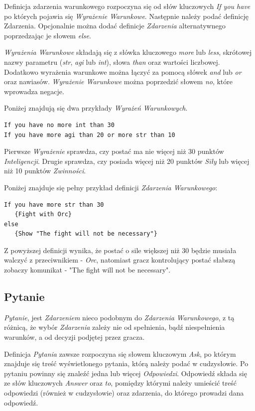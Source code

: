 \documentclass[openright]{xmgr}
\begin{document}
Definicja zdarzenia warunkowego rozpoczyna się od słów kluczowych \textit{If you have} po których pojawia się \textit{Wyrażenie Warunkowe}. Następnie należy podać definicję Zdarzenia. Opcjonalnie można dodać definicje \textit{Zdarzenia} alternatywnego poprzedzając je słowem \textit{else}.

\textit{Wyrażenia Warunkowe} składają się z słówka kluczowego \textit{more} lub \textit{less}, skrótowej nazwy parametru (\textit{str}, \textit{agi} lub \textit{int}), słowa \textit{than} oraz wartości liczbowej. Dodatkowo wyrażenia warunkowe można łączyć za pomocą słówek \textit{and} lub \textit{or} oraz nawiasów. \textit{Wyrażenie Warunkowe} można poprzedzić słowem \textit{no}, które wprowadza negacje.

Poniżej znajdują się dwa przykłady \textit{Wyrażeń Warunkowych}.
\begin{verbatim}
If you have no more int than 30
If you have more agi than 20 or more str than 10
\end{verbatim}

Pierwsze \textit{Wyrażenie} sprawdza, czy postać ma nie więcej niż 30 punktów \textit{Inteligencji}. Drugie sprawdza, czy posiada więcej niż 20 punktów \textit{Siły} lub więcej niż 10 punktów \textit{Zwinności}.

Poniżej znajduje się pełny przykład definicji \textit{Zdarzenia Warunkowego}: 
\begin{verbatim}
If you have more str than 30 
   {Fight with Orc}
else 
   {Show "The fight will not be necessary"}
\end{verbatim}

Z powyższej definicji wynika, że postać o sile większej niż 30 będzie musiała walczyć z przeciwnikiem - \textit{Orc}, natomiast gracz kontrolujący postać słabszą zobaczy komunikat - "The fight will not be necessary".

\subsection{Pytanie}
\textit{Pytanie}, jest \textit{Zdarzeniem} nieco podobnym do \textit{Zdarzenia Warunkowego}, z tą różnicą, że wybór \textit{Zdarzenia} zależy nie od spełnienia, bądź niespełnienia warunków, a od decyzji podjętej przez gracza.

Definicja \textit{Pytania} zawsze rozpoczyna się słowem kluczowym \textit{Ask}, po którym znajduje się treść wyświetlonego pytania, którą należy podać w cudzysłowie. Po pytaniu powinny się znaleźć jedna lub więcej \textit{Odpowiedzi}. Odpowiedź składa się ze słów kluczowych \textit{Answer} oraz \textit{to}, pomiędzy którymi należy umieścić treść odpowiedzi (również w cudzysłowie) oraz zdarzenia, do którego prowadzi dana odpowiedź. 
\end{document}
